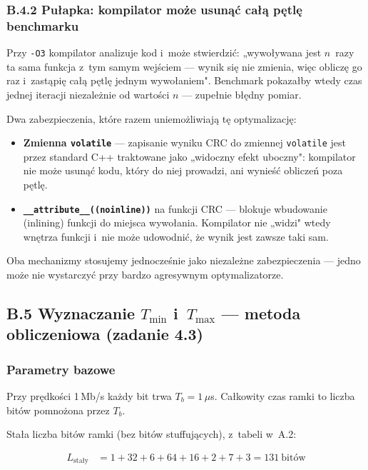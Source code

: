 \documentclass[12pt,a4paper]{article}
\begin{document}
\subsubsection*{B.4.2 Pułapka: kompilator może usunąć całą pętlę benchmarku}

Przy \texttt{-O3} kompilator analizuje kod i~może stwierdzić: „wywoływana
jest $n$~razy ta sama funkcja z~tym samym wejściem — wynik się nie zmienia,
więc obliczę go raz i~zastąpię całą pętlę jednym wywołaniem". Benchmark
pokazałby wtedy czas jednej iteracji niezależnie od wartości $n$ — zupełnie
błędny pomiar.

Dwa zabezpieczenia, które razem uniemożliwiają tę optymalizację:
\begin{itemize}
    \item \textbf{Zmienna \texttt{volatile}} — zapisanie wyniku CRC do zmiennej
          \texttt{volatile} jest przez standard C++ traktowane jako „widoczny
          efekt uboczny": kompilator nie może usunąć kodu, który do niej
          prowadzi, ani wynieść obliczeń poza pętlę.
    \item \textbf{\texttt{\_\_attribute\_\_((noinline))}} na funkcji CRC —
          blokuje wbudowanie (inlining) funkcji do miejsca wywołania.
          Kompilator nie „widzi" wtedy wnętrza funkcji i~nie może udowodnić,
          że wynik jest zawsze taki sam.
\end{itemize}
Oba mechanizmy stosujemy jednocześnie jako niezależne zabezpieczenia —
jedno może nie wystarczyć przy bardzo agresywnym optymalizatorze.

\subsection*{B.5 Wyznaczanie $T_{\min}$ i~$T_{\max}$ — metoda obliczeniowa (zadanie 4.3)}

\subsubsection*{Parametry bazowe}

Przy prędkości 1\,Mb/s każdy bit trwa $T_b = 1\,\mu$s. Całkowity czas ramki
to liczba bitów pomnożona przez $T_b$.

Stała liczba bitów ramki (bez bitów stuffujących), z~tabeli w~A.2:

\begin{align*}
L_{\text{stały}} &= 1 + 32 + 6 + 64 + 16 + 2 + 7 + 3 = 131\ \text{bitów}
\end{align*}
\end{document}
